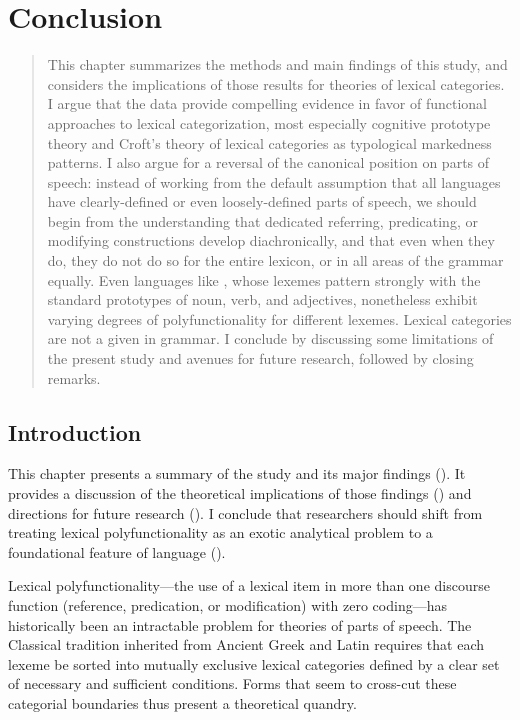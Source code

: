 \chapter{Conclusion}
\label{ch:conclusion}

\blockquote{This chapter summarizes the methods and main findings of this study, and considers the implications of those results for theories of lexical categories. I argue that the data provide compelling evidence in favor of functional approaches to lexical categorization, most especially cognitive prototype theory and Croft's theory of lexical categories as typological markedness patterns. I also argue for a reversal of the canonical position on parts of speech: instead of working from the default assumption that all languages have clearly-defined or even loosely-defined parts of speech, we should begin from the understanding that dedicated referring, predicating, or modifying constructions develop diachronically, and that even when they do, they do not do so for the entire lexicon, or in all areas of the grammar equally. Even languages like , whose lexemes pattern strongly with the standard prototypes of noun, verb, and adjectives, nonetheless exhibit varying degrees of polyfunctionality for different lexemes. Lexical categories are not a given in grammar. I conclude by discussing some limitations of the present study and avenues for future research, followed by closing remarks.}

\section{Introduction}
\label{sec:5.1}

This chapter presents a summary of the study and its major findings (). It provides a discussion of the theoretical implications of those findings () and directions for future research (). I conclude that researchers should shift from treating lexical polyfunctionality as an exotic analytical problem to a foundational feature of language ().

Lexical polyfunctionality—the use of a lexical item in more than one discourse function (reference, predication, or modification) with zero coding—has historically been an intractable problem for theories of parts of speech. The Classical tradition inherited from Ancient Greek and Latin requires that each lexeme be sorted into mutually exclusive lexical categories defined by a clear set of necessary and sufficient conditions. Forms that seem to cross-cut these categorial boundaries thus present a theoretical quandry.

